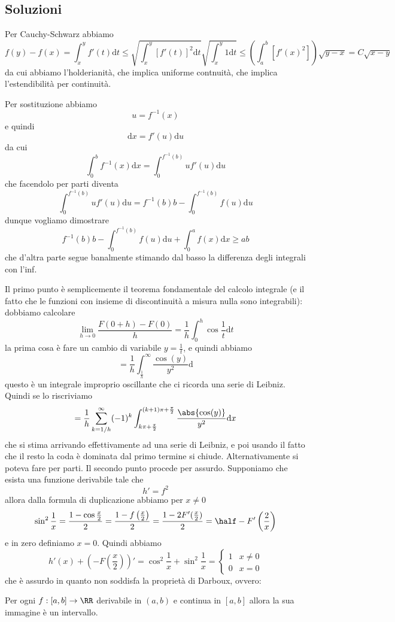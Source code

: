 \documentclass[11pt]{scrartcl}
\newcommand{\dif}{\text{d}}
\begin{document}
	\subsection{Soluzioni}
	\begin{answer}[Problema 1]
		Per Cauchy-Schwarz abbiamo
		$$f(y)-f(x)=\int_x^y f'(t)\dif t\le \sqrt{\int_x^y \left[f'(t)\right]^2\dif t}\sqrt{\int_x^y 1 \dif t}\le \left(\int_a^b \left[f'(x)^2\right]\right)\sqrt{y-x}=C\sqrt{x-y}$$
		da cui abbiamo l'holderianità, che implica uniforme contnuità, che implica l'estendibilità per continuità.
	\end{answer}
	\begin{answer}[Problema 2]
		Per sostituzione abbiamo
		$$u=f^{-1}(x) $$
		e quindi
		$$\dif x=f'(u)\dif u$$
		da cui
		$$\int_0^bf^{-1}(x)\dif x=\int_0^{f^{-1}(b)} uf'(u)\dif u$$
		che facendolo per parti diventa
		$$\int_0^{f^{-1}(b)} uf'(u)\dif u=f^{-1}(b)b-\int_0^{f^{-1}(b)}f(u)\dif u$$
		dunque vogliamo dimostrare
		$$f^{-1}(b)b-\int_0^{f^{-1}(b)}f(u)\dif u+\int_0^a f(x)\dif x\ge ab$$
		che d'altra parte segue banalmente stimando dal basso la differenza degli integrali con l'inf.
	\end{answer}
	\begin{answer}[Problema 3]
		Il primo punto è semplicemente il teorema fondamentale del calcolo integrale (e il fatto che le funzioni con insieme di discontinuità a misura nulla sono integrabili): dobbiamo calcolare
		$$\lim_{h\to 0}\frac{F(0+h)-F(0)}{h}=\frac{1}{h}\int_0^h \cos\frac{1}{t}\dif t$$
		la prima cosa è fare un cambio di variabile $y=\frac{1}{t}$, e quindi abbiamo
		$$=\frac{1}{h}\int_{\frac{1}{h}}^\infty \frac{\cos(y)}{y^2}\dif $$
		questo è un integrale improprio oscillante che ci ricorda una serie di Leibniz. Quindi se lo riscriviamo 
		$$=\frac{1}{h}\sum_{k=1/h}^\infty (-1)^k\int_{k\pi +\frac{\pi}{2}}^{(k+1)\pi +\frac{\pi}{2}}\frac{\abs{\cos(y)}}{y^2}\dif x$$
		che si stima arrivando effettivamente ad una serie di Leibniz, e poi usando il fatto che il resto la coda è dominata dal primo termine si chiude. Alternativamente si poteva fare per parti. Il secondo punto procede per assurdo. Supponiamo che esista una funzione derivabile tale che
		$$h'=f^2$$
		allora dalla formula di duplicazione abbiamo per $x\ne 0$
		$$\sin^2\frac{1}{x}=\frac{1-\cos\frac{x}{2}}{2}=\frac{1-f\left(\frac{x}{2}\right)}{2}=\frac{1-2F'(\frac{x}{2})}{2}=\half -F'\left(\frac{2}{x}\right)$$
		e in zero definiamo $x=0$. Quindi abbiamo
		$$h'(x)+\left(-F\left(\frac{x}{2}\right)\right)'=\cos^2\frac{1}{x}+\sin^2\frac{1}{x}=\begin{cases}
			1 & x\ne 0 \\
			0 & x=0
		\end{cases}$$
		che è assurdo in quanto non soddisfa la proprietà di Darboux, ovvero:
		\begin{lemma}[Darboux]
			Per ogni $f:[a,b]\to\RR$ derivabile in $(a,b)$ e continua in $[a,b]$ allora la sua immagine è un intervallo.
		\end{lemma}
	\end{answer}
	
\end{document}
